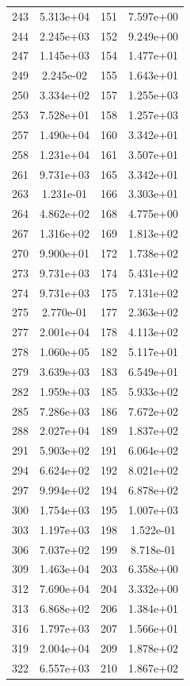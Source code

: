 \documentclass[12pt]{article}
\begin{document}
\begin{longtable}{@{}cccc@{}}
243 & 5.313e+04 & 151 & 7.597e+00 \\
244 & 2.245e+03 & 152 & 9.249e+00 \\
247 & 1.145e+03 & 154 & 1.477e+01 \\
249 & 2.245e-02 & 155 & 1.643e+01 \\
250 & 3.334e+02 & 157 & 1.255e+03 \\
253 & 7.528e+01 & 158 & 1.257e+03 \\
257 & 1.490e+04 & 160 & 3.342e+01 \\
258 & 1.231e+04 & 161 & 3.507e+01 \\
261 & 9.731e+03 & 165 & 3.342e+01 \\
263 & 1.231e-01 & 166 & 3.303e+01 \\
264 & 4.862e+02 & 168 & 4.775e+00 \\
267 & 1.316e+02 & 169 & 1.813e+02 \\
270 & 9.900e+01 & 172 & 1.738e+02 \\
273 & 9.731e+03 & 174 & 5.431e+02 \\
274 & 9.731e+03 & 175 & 7.131e+02 \\
275 & 2.770e-01 & 177 & 2.363e+02 \\
277 & 2.001e+04 & 178 & 4.113e+02 \\
278 & 1.060e+05 & 182 & 5.117e+01 \\
279 & 3.639e+03 & 183 & 6.549e+01 \\
282 & 1.959e+03 & 185 & 5.933e+02 \\
285 & 7.286e+03 & 186 & 7.672e+02 \\
288 & 2.027e+04 & 189 & 1.837e+02 \\
291 & 5.903e+02 & 191 & 6.064e+02 \\
294 & 6.624e+02 & 192 & 8.021e+02 \\
297 & 9.994e+02 & 194 & 6.878e+02 \\
300 & 1.754e+03 & 195 & 1.007e+03 \\
303 & 1.197e+03 & 198 & 1.522e-01 \\
306 & 7.037e+02 & 199 & 8.718e-01 \\
309 & 1.463e+04 & 203 & 6.358e+00 \\
312 & 7.690e+04 & 204 & 3.332e+00 \\
313 & 6.868e+02 & 206 & 1.384e+01 \\
316 & 1.797e+03 & 207 & 1.566e+01 \\
319 & 2.004e+04 & 209 & 1.878e+02 \\
322 & 6.557e+03 & 210 & 1.867e+02 \\

\end{longtable}
\end{document}
